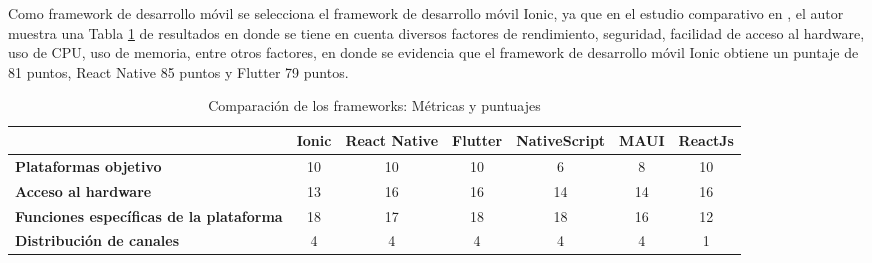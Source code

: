 Como framework de desarrollo móvil se selecciona el framework de desarrollo móvil Ionic, ya que en el estudio comparativo en \cite{ahmad_analysis_2023}, el autor muestra una Tabla \ref{tab:table_movil_frameworks_comparacion} de resultados en donde se tiene en cuenta diversos factores de rendimiento, seguridad, facilidad de acceso al hardware, uso de CPU, uso de memoria, entre otros factores, en donde se evidencia que el framework de desarrollo móvil Ionic obtiene un puntaje de 81 puntos, React Native 85 puntos y Flutter 79 puntos.


\begin{spacing}{1}
    \begin{small}
        \begin{center}
            \renewcommand*{\arraystretch}{1.4}
            \begin{longtable}[c]{ |>{\bfseries}p{}  |p{} |p{}  |p{}  |p{}  |p{}  |p{}|   }
                \caption[Comparación de los frameworks: Métricas y puntuajes]{ Comparación de los frameworks: Métricas y puntuajes \cite{ahmad_analysis_2023}}\label{tab:table_movil_frameworks_comparacion} \\
                \hline
                \multicolumn{1}{|c|}{ \textbf{Métrica}}  & \multicolumn{1}{c|}{\textbf{Ionic}} & \multicolumn{1}{c|}{ \textbf{React Native}} & \multicolumn{1}{c|}{ \textbf{Flutter}} & \multicolumn{1}{c|}{ \textbf{NativeScript}} & \multicolumn{1}{c|}{ \textbf{MAUI}} & \multicolumn{1}{c|}{ \textbf{ReactJs}}\\
                \hline
                Plataformas objetivo                   & \multicolumn{1}{c|}{10}             & \multicolumn{1}{c|}{10}                     & \multicolumn{1}{c|}{10} & \multicolumn{1}{c|}{6}  & \multicolumn{1}{c|}{8} & \multicolumn{1}{c|}{10} \\
                \hline
                Acceso al hardware                     & \multicolumn{1}{c|}{13}             & \multicolumn{1}{c|}{16}                     & \multicolumn{1}{c|}{16} & \multicolumn{1}{c|}{14} & \multicolumn{1}{c|}{14} & \multicolumn{1}{c|}{16} \\
                \hline
                Funciones específicas de la plataforma & \multicolumn{1}{c|}{18}             & \multicolumn{1}{c|}{17} & \multicolumn{1}{c|}{18} & \multicolumn{1}{c|}{18} & \multicolumn{1}{c|}{16} & \multicolumn{1}{c|}{12} \\
                \hline
                Distribución de canales                & \multicolumn{1}{c|}{4}              & \multicolumn{1}{c|}{4}                      & \multicolumn{1}{c|}{4}  & \multicolumn{1}{c|}{4}  & \multicolumn{1}{c|}{4}  & \multicolumn{1}{c|}{1}  \\

\end{longtable}
\end{center}
\end{small}
\end{spacing}
